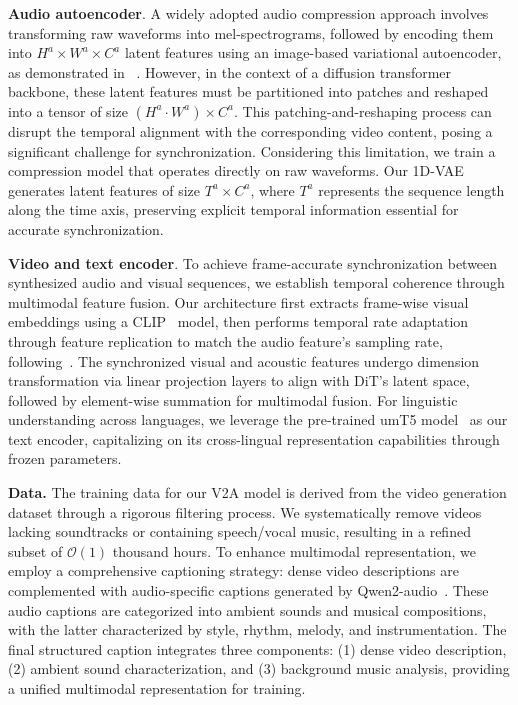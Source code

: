 \textbf{Audio autoencoder}. 
A widely adopted audio compression approach involves transforming raw waveforms into mel-spectrograms, followed by encoding them into $H^{a}\times W^{a}\times C^{a}$ latent features using an image-based variational autoencoder, as demonstrated in ~\citep{audioldm, audioldm2}. However, in the context of a diffusion transformer backbone, these latent features must be partitioned into patches and reshaped into a tensor of size $(H^a\cdot W^a)\times C^a$. This patching-and-reshaping process can disrupt the temporal alignment with the corresponding video content, posing a significant challenge for synchronization. Considering this limitation, we train a compression model that operates directly on raw waveforms. Our 1D-VAE generates latent features of size $T^{a}\times C^{a}$, where $T^a$ represents the sequence length along the time axis, preserving explicit temporal information essential for accurate synchronization.

\textbf{Video and text encoder}. To achieve frame-accurate synchronization between synthesized audio and visual sequences, we establish temporal coherence through multimodal feature fusion. Our architecture first extracts frame-wise visual embeddings using a CLIP~\cite{radford2021learning} model, then performs temporal rate adaptation through feature replication to match the audio feature's sampling rate, following~\citep{polyak2024moviegencastmedia}. The synchronized visual and acoustic features undergo dimension transformation via linear projection layers to align with DiT's latent space, followed by element-wise summation for multimodal fusion. For linguistic understanding across languages, we leverage the pre-trained umT5 model~\citep{chung2023unimax} as our text encoder, capitalizing on its cross-lingual representation capabilities through frozen parameters.

\textbf{Data.} The training data for our V2A model is derived from the video generation dataset through a rigorous filtering process. We systematically remove videos lacking soundtracks or containing speech/vocal music, resulting in a refined subset of $\mathcal{O}(1)$ thousand hours. To enhance multimodal representation, we employ a comprehensive captioning strategy: dense video descriptions are complemented with audio-specific captions generated by Qwen2-audio~\citep{qwen2-audio}. These audio captions are categorized into ambient sounds and musical compositions, with the latter characterized by style, rhythm, melody, and instrumentation. The final structured caption integrates three components: (1) dense video description, (2) ambient sound characterization, and (3) background music analysis, providing a unified multimodal representation for training.

